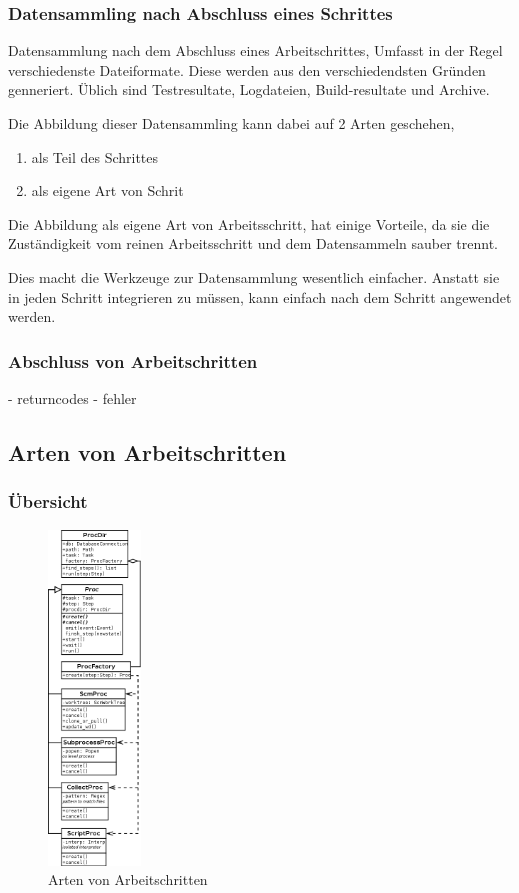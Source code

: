 \subsubsection{Datensammling nach Abschluss eines Schrittes}

Datensammlung nach dem Abschluss eines Arbeitschrittes,
Umfasst in der Regel verschiedenste Dateiformate.
Diese werden aus den verschiedendsten Gr\"unden genneriert.
\"Ublich sind Testresultate, Logdateien, Build-resultate und Archive.

Die Abbildung dieser Datensammling kann dabei auf 2 Arten geschehen,

\begin{enumerate}
    \item als Teil des Schrittes
    \item als eigene Art von Schrit
\end{enumerate}

Die Abbildung als eigene Art von Arbeitsschritt,
hat einige Vorteile, da sie die Zust\"andigkeit vom reinen Arbeitsschritt
und dem Datensammeln sauber trennt.

Dies macht die Werkzeuge zur Datensammlung wesentlich einfacher.
Anstatt sie in jeden Schritt integrieren zu m\"ussen,
kann einfach nach dem Schritt angewendet werden.


\subsubsection{Abschluss von Arbeitschritten}



- returncodes
- fehler

\subsection{Arten von Arbeitschritten}

\subsubsection{\"Ubersicht}

\begin{figure}[h!]
  \centering
  \label{fig:klassen-arten-arbeitsschritt}
  \includegraphics[height=3.5in]{imageinput/klassen-arten-arbeitsschritt.png}
  \caption{Arten von Arbeitschritten}
\end{figure}


